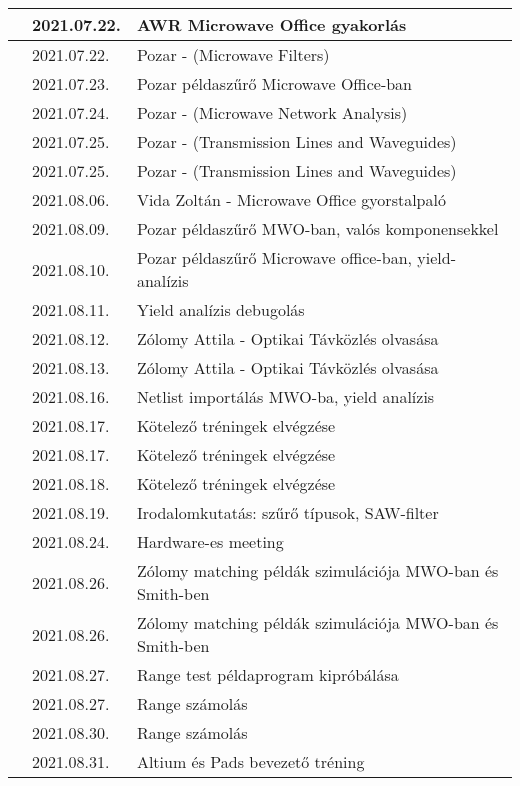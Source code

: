 \documentclass[10pt,a4paper,oneside]{report}
\newcounter{magicrownumbers}
\newcommand\rownum{\stepcounter{magicrownumbers}\arabic{magicrownumbers}}
\begin{document}
\begin{table}[h!]
\begin{tabular}{| c | p{3 cm} | p{10 cm} |}
	\rownum & 2021.07.22. & AWR Microwave Office gyakorlás \\ \hline
	\rownum & 2021.07.22. & Pozar - (Microwave Filters) \\ \hline
	\rownum & 2021.07.23. & Pozar példaszűrő Microwave Office-ban \\ \hline
	\rownum & 2021.07.24. & Pozar - (Microwave Network Analysis) \\ \hline
	\rownum & 2021.07.25. & Pozar - (Transmission Lines and Waveguides) \\ \hline
	\rownum & 2021.07.25. & Pozar - (Transmission Lines and Waveguides) \\ \hline
	\rownum & 2021.08.06. & Vida Zoltán - Microwave Office gyorstalpaló\\ \hline
	\rownum & 2021.08.09. & Pozar példaszűrő MWO-ban, valós komponensekkel \\ \hline
	\rownum & 2021.08.10. & Pozar példaszűrő Microwave office-ban, yield-analízis \\ \hline
	\rownum & 2021.08.11. & Yield analízis debugolás \\ \hline
	\rownum & 2021.08.12. & Zólomy Attila - Optikai Távközlés olvasása \\ \hline
	\rownum & 2021.08.13. & Zólomy Attila - Optikai Távközlés olvasása \\ \hline
	\rownum & 2021.08.16. & Netlist importálás MWO-ba, yield analízis \\ \hline
	\rownum & 2021.08.17. & Kötelező tréningek elvégzése \\ \hline
	\rownum & 2021.08.17. & Kötelező tréningek elvégzése \\ \hline
	\rownum & 2021.08.18. & Kötelező tréningek elvégzése \\ \hline
	\rownum & 2021.08.19. & Irodalomkutatás: szűrő típusok, SAW-filter \\ \hline
	\rownum & 2021.08.24. & Hardware-es meeting \\ \hline
	\rownum & 2021.08.26. & Zólomy matching példák szimulációja MWO-ban és Smith-ben \\ \hline
	\rownum & 2021.08.26. & Zólomy matching példák szimulációja MWO-ban és Smith-ben \\ \hline
	\rownum & 2021.08.27. & Range test példaprogram kipróbálása \\ \hline
	\rownum & 2021.08.27. & Range számolás \\ \hline
	\rownum & 2021.08.30. & Range számolás \\ \hline
	\rownum & 2021.08.31. & Altium és Pads bevezető tréning \\ \hline

\end{tabular}
\end{table}
\end{document}
